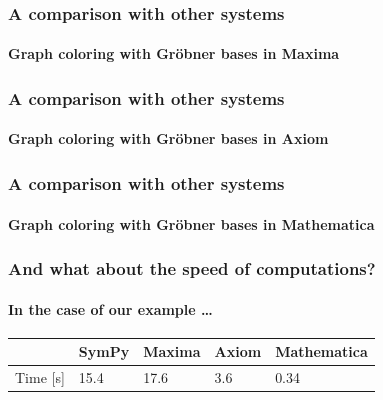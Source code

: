 \documentclass{beamer}
\begin{document}
\begin{frame}[fragile]
    \frametitle{A comparison with other systems}
    \framesubtitle{Graph coloring with Gr\"{o}bner bases in Maxima}

    
\end{frame}

\begin{frame}[fragile]
    \frametitle{A comparison with other systems}
    \framesubtitle{Graph coloring with Gr\"{o}bner bases in Axiom}

    
\end{frame}

\begin{frame}[fragile]
    \frametitle{A comparison with other systems}
    \framesubtitle{Graph coloring with Gr\"{o}bner bases in Mathematica}

    
\end{frame}

\begin{frame}[fragile]
    \frametitle{And what about the speed of computations?}
    \framesubtitle{In the case of our example \ldots}

    \begin{center}
        \begin{tabular}{l|llll} \toprule
                 & SymPy & Maxima & Axiom & Mathematica \\ \midrule
        Time [s] & 15.4  & 17.6   & 3.6   & 0.34        \\ \bottomrule
        \end{tabular}
    \end{center}
\end{frame}
\end{document}

